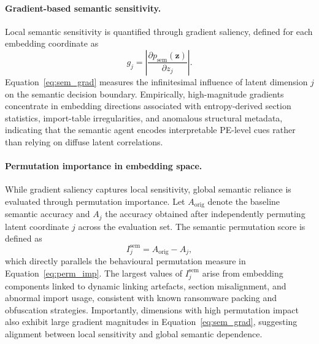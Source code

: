 \documentclass[3p]{elsarticle}
\begin{document}
\vspace{0.3em}
\paragraph{Gradient-based semantic sensitivity.}
Local semantic sensitivity is quantified through gradient saliency, defined for each
embedding coordinate as
\begin{equation}
g_j =
\left|
\frac{\partial p_{\mathrm{sem}}(\mathbf{z})}{\partial z_j}
\right|.
\label{eq:sem_grad}
\end{equation}
Equation~\eqref{eq:sem_grad} measures the infinitesimal influence of latent dimension $j$
on the semantic decision boundary.
Empirically, high-magnitude gradients concentrate in embedding directions associated
with entropy-derived section statistics, import-table irregularities, and anomalous
structural metadata, indicating that the semantic agent encodes interpretable PE-level cues
rather than relying on diffuse latent correlations.

\vspace{0.3em}
\paragraph{Permutation importance in embedding space.}
While gradient saliency captures local sensitivity, global semantic reliance is evaluated through permutation importance.
Let $A_{\mathrm{orig}}$ denote the baseline semantic accuracy and $A_j$ the accuracy obtained after independently permuting latent coordinate $j$ across the evaluation set. The semantic permutation score is defined as
\begin{equation}
I^{\mathrm{sem}}_j = A_{\mathrm{orig}} - A_j,
\label{eq:sem_perm}
\end{equation}
which directly parallels the behavioural permutation measure in Equation~\eqref{eq:perm_imp}.
The largest values of $I^{\mathrm{sem}}_j$ arise from embedding components linked to dynamic linking artefacts, section misalignment, and abnormal import usage, consistent with known ransomware packing and obfuscation strategies. Importantly, dimensions with high permutation impact also exhibit large gradient magnitudes in Equation~\eqref{eq:sem_grad}, suggesting alignment between local sensitivity and global semantic dependence.

\vspace{0.3em}
\end{document}
